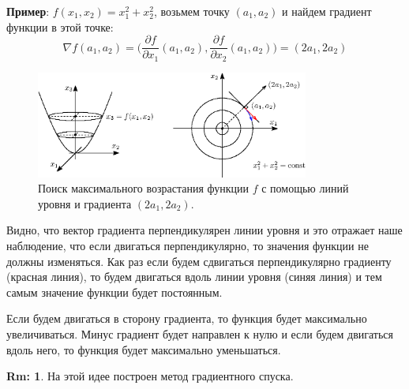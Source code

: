 \documentclass[12pt]{article}
\theoremstyle{definition}
\newtheorem{rem}{Rm:}
\begin{document}
\textbf{Пример}: $f(x_1,x_2) = x_1^2 + x_2^2$, возьмем точку $(a_1,a_2)$ и найдем градиент функции в этой точке: 
$$
	\nabla f(a_1,a_2) = \Big(\dfrac{\partial f}{\partial x_1}(a_1,a_2), \dfrac{\partial f}{\partial x_2}(a_1,a_2)\Big) = (2a_1, 2a_2)
$$
\begin{figure}[H]
	\centering
	\includegraphics[width=0.8\textwidth]{12_2.eps}
	\caption{Поиск максимального возрастания функции $f$ с помощью линий уровня и градиента $(2a_1, 2a_2)$.}
	\label{12_2}
\end{figure}
Видно, что вектор градиента перпендикулярен линии уровня и это отражает наше наблюдение, что если двигаться перпендикулярно, то значения функции не должны изменяться. Как раз если будем сдвигаться перпендикулярно градиенту (красная линия), то будем двигаться вдоль линии уровня (синяя линия) и тем самым значение функции будет постоянным.

Если будем двигаться в сторону градиента, то функция будет максимально увеличиваться. Минус градиент будет направлен к нулю и если будем двигаться вдоль него, то функция будет максимально уменьшаться.

\begin{rem}
	На этой идее построен метод градиентного спуска.
\end{rem}
\end{document}
